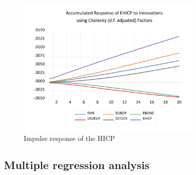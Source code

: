 \documentclass[12pt]{article}
\begin{document}
\begin{figure}[!htbp]
\begin{minipage}{0.5\hsize}
\begin{center}
        \end{center}
    \end{minipage}
    \begin{minipage}{0.5\hsize}
        \caption{Impulse response of the HICP}
        \begin{center}
            \includegraphics[width=9cm]{iehicp.pdf}
        \end{center}
    \end{minipage}
\end{figure}

\newpage
\subsection{Multiple regression analysis}
\end{document}
